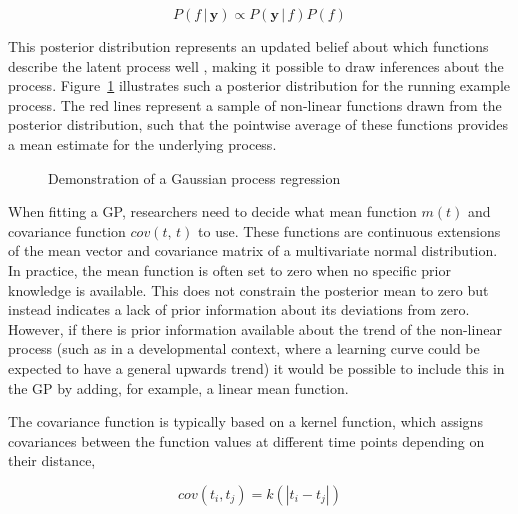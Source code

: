 \documentclass[man, floatsintext]{apa7}
\begin{document}
\begin{equation}
  P(f \, | \, \textbf{y})  \propto P(\textbf{y} \, | \, f) P(f)
\end{equation}

\noindent This posterior distribution represents an updated belief about which
functions describe the latent process well \parencite{kruschke_doing_2011},
making it possible to draw inferences about the process.
Figure~\ref{fig:gp_dem} illustrates such a posterior distribution for the
running example process. The red lines represent a sample of non-linear
functions drawn from the posterior distribution, such that the pointwise
average of these functions provides a mean estimate for the underlying process.

\begin{figure}[!t]
  \caption{Demonstration of a Gaussian process regression}
  \label{fig:gp_dem}
\end{figure}

When fitting a GP, researchers need to decide what mean function $m(t)$ and
covariance function $cov(t, \, t)$ to use. These functions are continuous
extensions of the mean vector and covariance matrix of a multivariate normal
distribution. In practice, the mean function is often set to zero when no
specific prior knowledge is available. This does not constrain the posterior
mean to zero but instead indicates a lack of prior information about its
deviations from zero. However, if there is prior information available about
the trend of the non-linear process (such as in a developmental context, where
a learning curve could be expected to have a general upwards trend) it would be
possible to include this in the GP by adding, for example, a linear mean
function.

The covariance function is typically based on a kernel function, which assigns
covariances between the function values at different time points depending on
their distance,

\begin{equation}
  cov(t_i, t_j) = k(|t_i - t_j|)
\end{equation}
\end{document}
